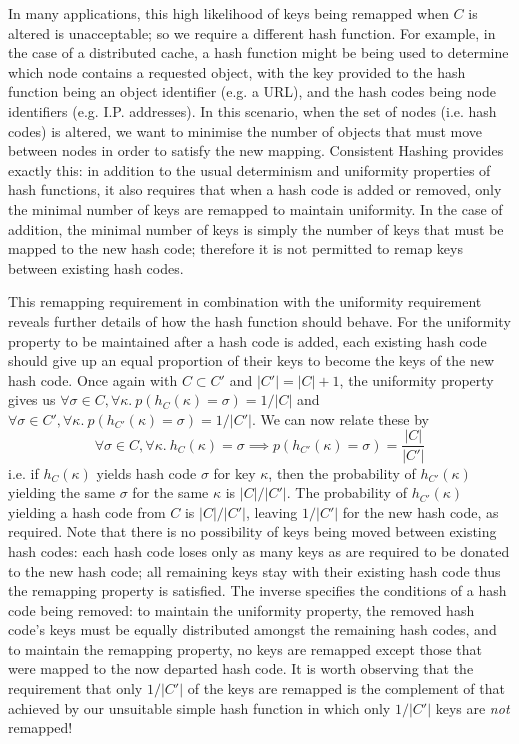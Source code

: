 \documentclass[runningheads,a4paper]{llncs}
\begin{document}
In many applications, this high likelihood of keys being remapped when
$C$ is altered is unacceptable; so we require a different hash
function. For example, in the case of a distributed cache, a hash
function might be being used to determine which node contains a
requested object, with the key provided to the hash function being an
object identifier (e.g. a URL), and the hash codes being node
identifiers (e.g. I.P. addresses). In this scenario, when the set of
nodes (i.e. hash codes) is altered, we want to minimise the number of
objects that must move between nodes in order to satisfy the new
mapping. Consistent Hashing \cite{Karger1997} provides exactly this:
in addition to the usual determinism and uniformity properties of hash
functions, it also requires that when a hash code is added or removed,
only the minimal number of keys are remapped to maintain
uniformity. In the case of addition, the minimal number of keys is
simply the number of keys that must be mapped to the new hash code;
therefore it is not permitted to remap keys between existing hash
codes.

This remapping requirement in combination with the uniformity
requirement reveals further details of how the hash function should
behave. For the uniformity property to be maintained after a hash code
is added, each existing hash code should give up an equal proportion
of their keys to become the keys of the new hash code. Once again with
$C \subset C'$ and $|C'| = |C| + 1$, the uniformity property gives us
$\forall \sigma \in C, \forall \kappa. \: p(h_C(\kappa) = \sigma) =
1/|C|$ and $\forall \sigma \in C', \forall \kappa. \: p(h_{C'}(\kappa)
= \sigma) = 1/|C'|$. We can now relate these by \[ \forall \sigma \in
C, \forall \kappa. \: h_C(\kappa) = \sigma \implies p(h_{C'}(\kappa) =
\sigma) = \frac{|C|}{|C'|} \] i.e. if $h_C(\kappa)$ yields hash code
$\sigma$ for key $\kappa$, then the probability of $h_{C'}(\kappa)$
yielding the same $\sigma$ for the same $\kappa$ is $|C| / |C'|$. The
probability of $h_{C'}(\kappa)$ yielding a hash code from $C$ is $|C|
/ |C'|$, leaving $1 / |C'|$ for the new hash code, as required. Note
that there is no possibility of keys being moved between existing hash
codes: each hash code loses only as many keys as are required to be
donated to the new hash code; all remaining keys stay with their
existing hash code thus the remapping property is satisfied. The
inverse specifies the conditions of a hash code being removed: to
maintain the uniformity property, the removed hash code's keys must be
equally distributed amongst the remaining hash codes, and to maintain
the remapping property, no keys are remapped except those that were
mapped to the now departed hash code. It is worth observing that the
requirement that only $1/|C'|$ of the keys are remapped is the
complement of that achieved by our unsuitable simple hash function in
which only $1/|C'|$ keys are {\em not} remapped!
\end{document}
